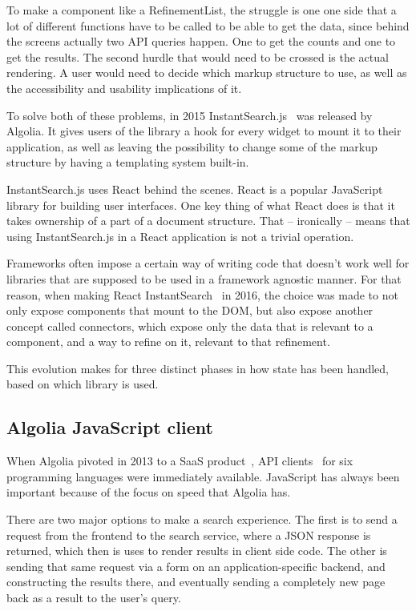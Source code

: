 To make a component like a RefinementList, the struggle is one one side that a lot of different functions have to be called to be able to get the data, since behind the screens actually two API queries happen. One to get the counts and one to get the results. The second hurdle that would need to be crossed is the actual rendering. A user would need to decide which markup structure to use, as well as the accessibility and usability implications of it.

To solve both of these problems, in 2015 InstantSearch.js~\cite{instantsearch-js} was released by Algolia. It gives users of the library a hook for every widget to mount it to their application, as well as leaving the possibility to change some of the markup structure by having a templating system built-in. 

InstantSearch.js uses React behind the scenes. React\cite{react-doc} is a popular JavaScript library for building user interfaces. One key thing of what React does is that it takes ownership of a part of a document structure. That -- ironically -- means that using InstantSearch.js in a React application is not a trivial operation.

Frameworks often impose a certain way of writing code that doesn't work well for libraries that are supposed to be used in a framework agnostic manner. For that reason, when making React InstantSearch~\cite{react-instantsearch} in 2016, the choice was made to not only expose components that mount to the DOM, but also expose another concept called connectors, which expose only the data that is relevant to a component, and a way to refine on it, relevant to that refinement.

This evolution makes for three distinct phases in how state has been handled, based on which library is used.

\subsection{Algolia JavaScript client} %
\label{sub:algolia_js_client}

When Algolia pivoted in 2013 to a SaaS product~\cite{algolia-blog-saas}, API clients~\cite{algolia-blog-lauch} for six programming languages were immediately available. JavaScript has always been important because of the focus on speed that Algolia has.

There are two major options to make a search experience. The first is to send a request from the frontend to the search service, where a JSON response is returned, which then is uses to render results in client side code. The other is sending that same request via a form on an application-specific backend, and constructing the results there, and eventually sending a completely new page back as a result to the user's query.

